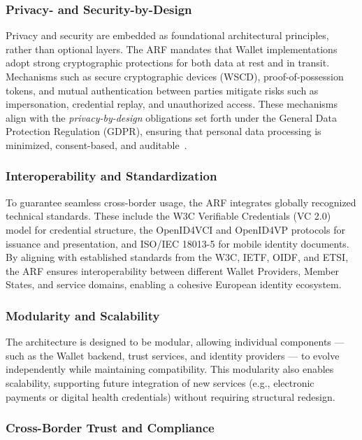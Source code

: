 \documentclass[sigconf,balance,nonacm,authordraft]{acmart}
\begin{document}
\subsubsection*{Privacy- and Security-by-Design}
Privacy and security are embedded as foundational architectural principles, rather than optional layers. The ARF mandates that Wallet implementations adopt strong cryptographic protections for both data at rest and in transit. Mechanisms such as secure cryptographic devices (WSCD), proof-of-possession tokens, and mutual authentication between parties mitigate risks such as impersonation, credential replay, and unauthorized access. These mechanisms align with the \textit{privacy-by-design} obligations set forth under the General Data Protection Regulation (GDPR), ensuring that personal data processing is minimized, consent-based, and auditable~\cite{EU_eIDAS2024}.

\subsubsection*{Interoperability and Standardization}
To guarantee seamless cross-border usage, the ARF integrates globally recognized technical standards. These include the W3C Verifiable Credentials (VC 2.0) model for credential structure, the OpenID4VCI and OpenID4VP protocols for issuance and presentation, and ISO/IEC 18013-5 for mobile identity documents. By aligning with established standards from the W3C, IETF, OIDF, and ETSI, the ARF ensures interoperability between different Wallet Providers, Member States, and service domains, enabling a cohesive European identity ecosystem.


\subsubsection*{Modularity and Scalability}
The architecture is designed to be modular, allowing individual components — such as the Wallet backend, trust services, and identity providers — to evolve independently while maintaining compatibility. This modularity also enables scalability, supporting future integration of new services (e.g., electronic payments or digital health credentials) without requiring structural redesign.

\subsubsection*{Cross-Border Trust and Compliance}
\end{document}
